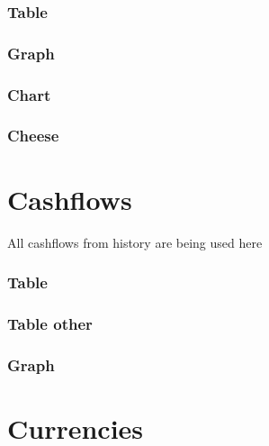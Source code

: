\documentclass[8pt]{article} %
\begin{document}
\subsubsection{Table}

\subsubsection{Graph}

\subsubsection{Chart}
\subsubsection{Cheese}


\section{Cashflows}


All cashflows from history are being used here\\

\subsubsection{Table}

\subsubsection{Table other}

\subsubsection{Graph}
%

\section{Currencies}

\end{document}
